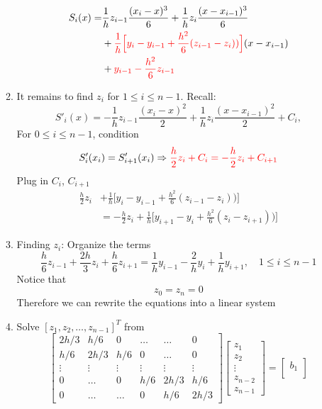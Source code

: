 \documentclass{article}
\theoremstyle{remark}
\begin{document}
\begin{enumerate}
\begin{enumerate}
\begin{equation}
\begin{split}
 S_i(x) = &\frac{1}{h}z_{i-1}\frac{(x_{i}-x)^3}{6} +\frac{1}{h} z_{i}\frac{(x-x_{i-1})^3}{6} \\
 & + {\color{red} \frac{1}{h}\Big[y_i-y_{i-1}+\frac{h^2}{6}(z_{i-1}-z_{i}))\Big]}(x-x_{i-1}) \\
 & +  {\color{red} y_{i-1}- \frac{h^2}{6}z_{i-1}}
 \end{split}
\end{equation}
\item It remains to find $z_i$ for $1\leq i\leq n-1$. Recall:
$$
S'_i(x) = -\frac{1}{h}z_{i-1}\frac{(x_{i}-x)^2}{2} +\frac{1}{h} z_{i}\frac{(x-x_{i-1})^2}{2} + C_i,
$$
For $0\leq i \leq n-1$, condition
$$
S_i'(x_{i}) = S_{i+1}'(x_{i}) \Rightarrow {\color{red} \frac{h}{2}z_i+C_i = -\frac{h}{2}z_{i}+C_{i+1}}
$$
Plug in $C_i$, $C_{i+1}$
\begin{equation*}\nonumber
\begin{split}
\frac{h}{2}z_i&+\frac{1}{h}\Big[y_i-y_{i-1}+\frac{h^2}{6}(z_{i-1}-z_{i}))\Big]\\
 &= -\frac{h}{2}z_{i}+\frac{1}{h}\Big[y_{i+1}-y_{i}+\frac{h^2}{6}(z_{i}-z_{i+1}))\Big]
\end{split}
\end{equation*}
\item Finding $z_i$: Organize the terms
$$
\frac{h}{6}z_{i-1} + \frac{2h}{3}z_{i} + \frac{h}{6}z_{i+1} = \frac{1}{h}y_{i-1} -\frac{2}{h}y_i+\frac{1}{h}y_{i+1},\quad 1\leq i\leq n-1
$$
Notice that
$$
z_0 = z_n = 0
$$
Therefore we can rewrite the equations into a linear system
\item Solve $[z_1,z_2,\dots,z_{n-1}]^T$ from
$$
\begin{bmatrix}
2h/3 & h/6 & 0 & \dots & \dots & 0\\
h/6 & 2h/3 & h/6 & 0&  \dots & 0\\
\vdots & \vdots & \vdots & \vdots & \vdots & \vdots \\
 0 & \dots  & 0 & h/6 & 2h/3 &h/6\\
 0 & \dots & \dots & 0 & h/6 & 2h/3
\end{bmatrix}
\begin{bmatrix}
z_1\\
z_2\\
\vdots\\
z_{n-2}\\
z_{n-1}
\end{bmatrix} = \begin{bmatrix}
b_1\\

\end{bmatrix}$$
\end{enumerate}
\end{enumerate}
\end{document}
